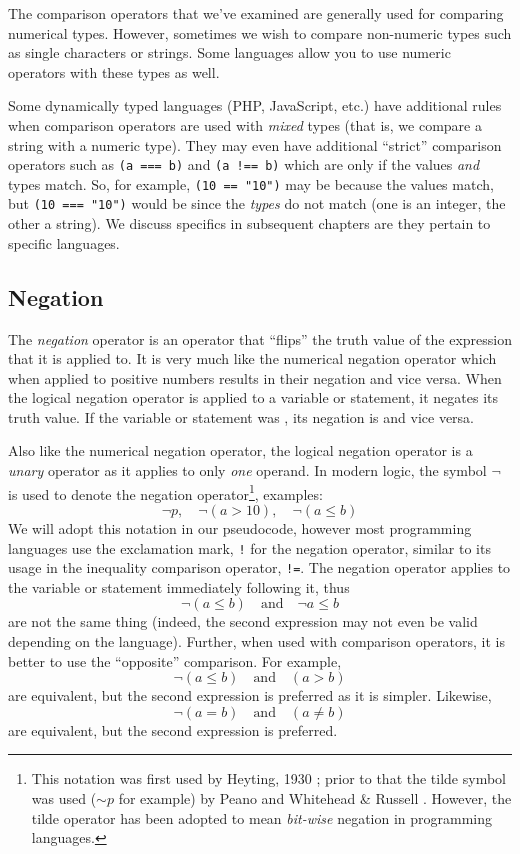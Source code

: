 The comparison operators that we've examined are generally used for comparing
numerical types.  However, sometimes we wish to compare non-numeric 
types such as single characters or strings.  Some languages allow you to
use numeric operators with these types as well.  

Some dynamically typed languages (PHP, JavaScript, etc.) have additional rules 
when comparison operators are used with \emph{mixed} types (that is, we compare
a string with a numeric type).  They may even have additional ``strict'' comparison
operators such as \texttt{(a === b)} and \texttt{(a !== b)} which are \True only if
the values \emph{and} types match.  So, for example, \texttt{(10 == "10")} may
be \True because the values match, but \texttt{(10 === "10")} would be \False
since the \emph{types} do not match (one is an integer, the other a string).  We
discuss specifics in subsequent chapters are they pertain to specific languages.

\subsection{Negation}

The \emph{negation} operator is an operator that ``flips'' the truth value of
the expression that it is applied to.  It is very much like the numerical negation
operator which when applied to positive numbers results in their negation and
vice versa.  When the logical negation operator is applied to a variable or
statement, it negates its truth value.  If the variable or statement was \True, 
its negation is \False and vice versa.  

Also like the numerical negation operator, the logical negation operator is
a \emph{unary} operator as it applies to only \emph{one} operand.  In modern
logic, the symbol $\neg$ is used to denote the negation operator\footnote{
This notation was first used by Heyting, 1930 \cite{Heyting1930}; prior to that
the tilde symbol was used ($\mathord{\sim} p$ for example) by Peano \cite{GlossarWiki:Peano:1897a} and
Whitehead \& Russell \cite{WhiteheadRussell1910}.  However, the tilde operator
has been adopted to mean \emph{bit-wise} negation in programming languages.}, 
examples:
  $$\neg p, \quad \neg(a > 10), \quad \neg(a \leq b)$$
We will adopt this notation in our pseudocode, however most programming 
languages use the exclamation mark, \texttt{!} for the negation operator, 
similar to its usage in the inequality comparison operator, \texttt{!=}.
The negation operator applies to the variable or statement immediately following
it, thus
  $$\neg(a \leq b) \quad \textrm{and}\quad \neg a \leq b$$
are not the same thing (indeed, the second expression may not even
be valid depending on the language).  Further, when used with comparison
operators, it is better to use the ``opposite'' comparison.  For example, 
  $$\neg(a \leq b) \quad \textrm{and} \quad (a > b)$$
are equivalent, but the second expression is preferred as it is simpler.
Likewise, 
  $$\neg(a = b) \quad\textrm{and}\quad (a \neq b)$$
are equivalent, but the second expression is preferred.

